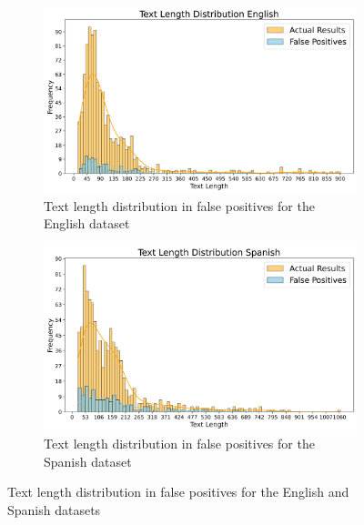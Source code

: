 \documentclass{Configuration_Files/PoliMi3i_thesis}
\begin{document}
\begin{figure}[h]
\centering
\begin{subfigure}
\centering
\includegraphics[width=0.86\linewidth, height=0.3\textheight]{Images/text_length_distribution_english_v2.png}
\caption{\small Text length distribution in false positives for the English dataset}
\label{fig:text_length_en}
\end{subfigure}
\begin{subfigure}
\centering
\includegraphics[width=0.86\linewidth, height=0.3\textheight]{Images/text_length_distribution_spanish_v2.png}
\caption{\small Text length distribution in false positives for the Spanish dataset}
\label{fig:text_length_es}
\end{subfigure}
\caption{\small Text length distribution in false positives for the English and Spanish datasets}
\label{fig:text_length_en_es}
\end{figure}
\FloatBarrier
\end{document}
